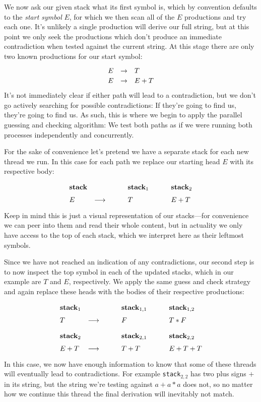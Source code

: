 \documentclass[twoside]{article}
\newcommand{\lra}{\longrightarrow}
\newcommand{\bfmbox}[1]{\mbox{\bfseries #1}}
\newcommand{\col}[1][0ex]{& \hspace{#1}}
\begin{document}
We now ask our given stack what its first symbol is, which by convention defaults to the \emph{start symbol} $ E $,
for which we then scan all of the $ E $ productions and try each one. It's unlikely a single production will derive
our full string, but at this point we only seek the productions which don't produce an immediate contradiction when
tested against the current string. At this stage there are only two known productions for our start symbol:
$$ \def\arraystretch{1.2}
\begin{array}{rcl}
E & \to & T				\\
E & \to & E+T
\end{array} $$
It's not immediately clear if either path will lead to a contradiction, but we don't go actively searching for
possible contradictions: If they're going to find us, they're going to find us. As such, this is where we begin
to apply the parallel guessing and checking algorithm: We test both paths as if we were running both processes
independently and concurrently.

For the sake of convenience let's pretend we have a separate stack for each new thread we run.
In this case for each path we replace our starting head $ E $ with its respective body:
$$ \def\arraystretch{1.5}
\begin{array}{lcll}
\bfmbox{stack}		\col		\col[5ex] \bfmbox{stack}_1		\col[5ex] \bfmbox{stack}_2		\\
E			\col \lra	\col[5ex] T				\col[5ex] E+T
\end{array} $$
Keep in mind this is just a visual representation of our stacks---for convenience we can peer into them and read
their whole content, but in actuality we only have access to the top of each stack, which we interpret here as
their leftmost symbols.

Since we have not reached an indication of any contradictions, our second step is to now inspect the top symbol
in each of the updated stacks, which in our example are $ T $ and $ E $, respectively. We apply the same guess
and check strategy and again replace these heads with the bodies of their respective productions:
$$ \def\arraystretch{1.5}
\begin{array}{lcll}
\bfmbox{stack}_1	\col		\col[5ex] \bfmbox{stack}_{1,1}		\col[5ex] \bfmbox{stack}_{1,2}			\\
T			\col \lra	\col[5ex] F				\col[5ex] T*F					\\[1ex]

\bfmbox{stack}_2	\col		\col[5ex] \bfmbox{stack}_{2,1}		\col[5ex] \bfmbox{stack}_{2,2}			\\
E+T			\col \lra	\col[5ex] T+T				\col[5ex] E+T+T
\end{array} $$
In this case, we now have enough information to know that some of these threads will eventually lead to contradictions.
For example \texttt{stack}$_{2,2}$ has two plus signs $ + $ in its string, but the string we're testing against
$ a+a*a $ does not, so no matter how we continue this thread the final derivation will inevitably not match.
\end{document}
